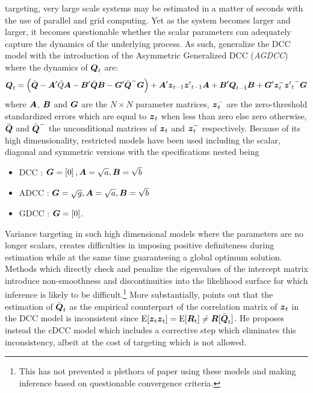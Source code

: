 targeting, very large scale systems may be estimated in a matter of seconds with
the use of parallel and grid computing. Yet as the system becomes larger and
larger, it becomes questionable whether the scalar parameters can adequately
capture the dynamics of the underlying process. As such, \cite{Cappiello2006}
generalize the DCC model with the introduction of the Asymmetric Generalized
DCC (\emph{AGDCC}) where the dynamics of $\mbox{\boldmath$Q$}_t$ are:
\begin{equation}\label{eq:agdcc1}
{\ensuremath{\mbox{\boldmath$Q$}}_t} = \left( {\bar {\mbox{\boldmath$Q$}} - \mbox{\boldmath$A$}'\bar Q\mbox{\boldmath$A$} - \mbox{\boldmath$B$}'\bar {\mbox{\boldmath$Q$}}\mbox{\boldmath$B$} - \mbox{\boldmath$G$}'{{\bar {\mbox{\boldmath$Q$}}}^ - }\mbox{\boldmath$G$}} \right) + \mbox{\boldmath$A$}'{\mbox{\boldmath$z$}_{t - 1}}{{\mbox{\boldmath$z$}'}_{t - 1}}\mbox{\boldmath$A$} + \mbox{\boldmath$B$}'{\mbox{\boldmath$Q$}_{t - 1}}\mbox{\boldmath$B$} + \mbox{\boldmath$G$}'\mbox{\boldmath$z$}_t^ - {{\mbox{\boldmath$z$}'}_t}^ - \mbox{\boldmath$G$}
\end{equation}
where $\mbox{\boldmath$A$}$, $\mbox{\boldmath$B$}$ and $\mbox{\boldmath$G$}$ are the $N\times N$ parameter matrices,
$\mbox{\boldmath$z$}_t^ -$ are the zero-threshold standardized errors which are equal
to $\mbox{\boldmath$z$}_t$ when less than zero else zero otherwise, $\bar {\mbox{\boldmath$Q$}}$ and $\bar {\mbox{\boldmath$Q$}}^ -$
the unconditional matrices of $\mbox{\boldmath$z$}_t$ and $\mbox{\boldmath$z$}_t^-$ respectively. Because of
its high dimensionality, restricted models have been used including the scalar,
diagonal and symmetric versions with the specifications nested being
\begin{itemize}
\item  DCC : $\mbox{\boldmath$G$} = \left[ 0 \right],\mbox{\boldmath$A$} = \sqrt a ,\mbox{\boldmath$B$} = \sqrt b$
\item ADCC : $\mbox{\boldmath$G$} = \sqrt g ,\mbox{\boldmath$A$} = \sqrt a ,\mbox{\boldmath$B$} = \sqrt b$
\item GDCC : $\mbox{\boldmath$G$} = \left[ 0 \right]$.
\end{itemize}
Variance targeting in such high dimensional models where the parameters are no
longer scalars, creates difficulties in imposing positive definiteness during
estimation while at the same time guaranteeing a global optimum solution. Methods
which directly check and penalize the eigenvalues of the intercept matrix introduce
non-smoothness and discontinuities into the likelihood surface for which inference
is likely to be difficult.\footnote{This has not prevented a plethora of paper
using these models and making inference based on questionable convergence
criteria.} More substantially, \cite{Aielli2009} points out that the
estimation of $\bar {\mbox{\boldmath$Q$}}_t$ as the empirical counterpart of the correlation
matrix of $\mbox{\boldmath$z$}_t$ in the DCC model is inconsistent since $\rm E[\mbox{\boldmath$z$}_t \mbox{\boldmath$z$}_t]=\rm E[\mbox{\boldmath$R$}_t]\neq \mbox{\boldmath$R$}[\bar {\mbox{\boldmath$Q$}}_t]$.
He proposes instead the cDCC model which includes a corrective step which eliminates
this inconsistency, albeit at the cost of targeting which is not allowed.\\

